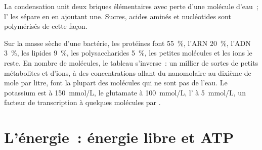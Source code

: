 \begin{omfigure}

{\small La condensation unit deux briques élémentaires avec perte d'une
molécule d'eau~; l' les sépare en en ajoutant une. Sucres,
acides aminés et nucléotides sont polymérisés de cette façon.}
\end{omfigure}

\begin{example}\label{ex:b1:water-small-molecules:inventory}
Sur la masse sèche d'une bactérie, les protéines font \qty{55}{\%},
l'ARN \qty{20}{\%}, l'ADN \qty{3}{\%}, les lipides \qty{9}{\%}, les
polysaccharides \qty{5}{\%}, les petites molécules et les ions le reste.
En nombre de molécules, le tableau s'inverse~: un millier de sortes de
petits métabolites et d'ions, à des concentrations allant du nanomolaire
au dixième de mole par litre, font la plupart des molécules qui ne sont
pas de l'eau. Le potassium est à \qty{150}{mmol/L}, le glutamate à
\qty{100}{mmol/L}, l' à \qty{5}{mmol/L}, un facteur de transcription
à quelques molécules par .
\end{example}

\section{L'énergie~: énergie libre et ATP}

